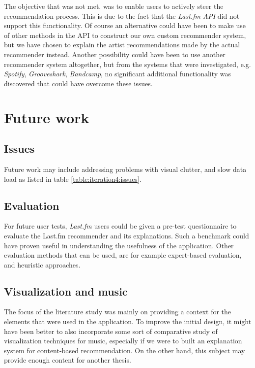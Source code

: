 The objective that was not met, was to enable users to actively steer the recommendation process. This is due to the fact that the \emph{Last.fm API} did not support this functionality. Of course an alternative could have been to make use of other methods in the API to construct our own custom recommender system, but we have chosen to explain the artist recommendations made by the actual recommender instead. Another possibility could have been to use another recommender system altogether, but from the systems that were investigated, e.g. \emph{Spotify}, \emph{Grooveshark}, \emph{Bandcamp}, no significant additional functionality was discovered that could have overcome these issues.



\section{Future work}

\subsection{Issues}

Future work may include addressing problems with visual clutter, and slow data load as listed in table \ref{table:iteration4:issues}.


\subsection{Evaluation}

For future user tests, \emph{Last.fm} users could be given a pre-test questionnaire to evaluate the Last.fm recommender and its explanations. Such a benchmark could have proven useful in understanding the usefulness of the application. Other evaluation methods that can be used, are for example expert-based evaluation, and heuristic approaches.


\subsection{Visualization and music}

The focus of the literature study was mainly on providing a context for the elements that were used in the application. To improve the initial design, it might have been better to also incorporate some sort of comparative study of visualization techniques for music, especially if we were to built an explanation system for content-based recommendation. On the other hand, this subject may provide enough content for another thesis.


